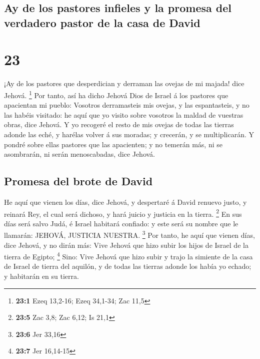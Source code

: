 \hypertarget{ay-de-los-pastores-infieles-y-la-promesa-del-verdadero-pastor-de-la-casa-de-david}{%
\subsection{Ay de los pastores infieles y la promesa del verdadero
pastor de la casa de
David}\label{ay-de-los-pastores-infieles-y-la-promesa-del-verdadero-pastor-de-la-casa-de-david}}

\hypertarget{section-22}{%
\section{23}\label{section-22}}

 ¡Ay de los pastores que desperdician y derraman las ovejas
de mi majada! dice Jehová. \footnote{\textbf{23:1} Ezeq 13,2-16; Ezeq
  34,1-34; Zac 11,5}  Por tanto, así ha dicho Jehová Dios de
Israel á los pastores que apacientan mi pueblo: Vosotros derramasteis
mis ovejas, y las espantasteis, y no las habéis visitado: he aquí que yo
visito sobre vosotros la maldad de vuestras obras, dice Jehová.
 Y yo recogeré el resto de mis ovejas de todas las tierras
adonde las eché, y harélas volver á sus moradas; y crecerán, y se
multiplicarán.  Y pondré sobre ellas pastores que las
apacienten; y no temerán más, ni se asombrarán, ni serán menoscabadas,
dice Jehová.

\hypertarget{promesa-del-brote-de-david}{%
\subsection{Promesa del brote de
David}\label{promesa-del-brote-de-david}}

 He aquí que vienen los días, dice Jehová, y despertaré á
David renuevo justo, y reinará Rey, el cual será dichoso, y hará juicio
y justicia en la tierra. \footnote{\textbf{23:5} Zac 3,8; Zac 6,12; Is
  21,1}  En sus días será salvo Judá, é Israel habitará
confiado: y este será su nombre que le llamarán: JEHOVÁ, JUSTICIA
NUESTRA. \footnote{\textbf{23:6} Jer 33,16}  Por tanto, he
aquí que vienen días, dice Jehová, y no dirán más: Vive Jehová que hizo
subir los hijos de Israel de la tierra de Egipto; \footnote{\textbf{23:7}
  Jer 16,14-15}  Sino: Vive Jehová que hizo subir y trajo la
simiente de la casa de Israel de tierra del aquilón, y de todas las
tierras adonde los había yo echado; y habitarán en su tierra.

